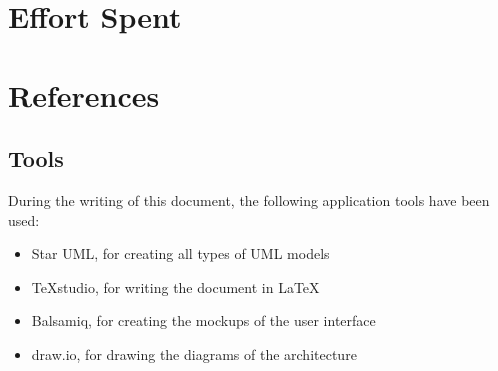 \documentclass[11pt,a4paper]{report}
\begin{document}
\chapter{Effort Spent}
\chapter{References}
\section{Tools}
During the writing of this document, the following application tools have been used:
\begin{itemize}
	\item Star UML, for creating all types of UML models
	\item TeXstudio, for writing the document in \LaTeX
	\item Balsamiq, for creating the mockups of the user interface
	\item draw.io, for drawing the diagrams of the architecture
\end{itemize}
\end{document}
